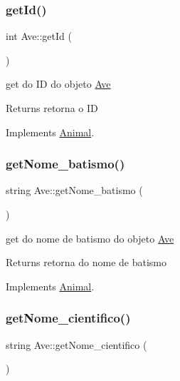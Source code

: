 \subsubsection{\texorpdfstring{getId()}{getId()}}
{\footnotesize\ttfamily int Ave\+::get\+Id (\begin{DoxyParamCaption}{ }\end{DoxyParamCaption})\hspace{0.3cm}{\ttfamily [virtual]}}



get do ID do objeto \mbox{\hyperlink{class_ave}{Ave}} 

\begin{DoxyReturn}{Returns}
retorna o ID 
\end{DoxyReturn}


Implements \mbox{\hyperlink{class_animal}{Animal}}.

\mbox{\label{class_ave_a12883f9a6f23577a64b39b26c9a8a88c}} 
\subsubsection{\texorpdfstring{getNome\_batismo()}{getNome\_batismo()}}
{\footnotesize\ttfamily string Ave\+::get\+Nome\+\_\+batismo (\begin{DoxyParamCaption}{ }\end{DoxyParamCaption})\hspace{0.3cm}{\ttfamily [virtual]}}



get do nome de batismo do objeto \mbox{\hyperlink{class_ave}{Ave}} 

\begin{DoxyReturn}{Returns}
retorna do nome de batismo 
\end{DoxyReturn}


Implements \mbox{\hyperlink{class_animal}{Animal}}.

\mbox{\label{class_ave_a6e40addf9eb4e33849279157285e774c}} 
\subsubsection{\texorpdfstring{getNome\_cientifico()}{getNome\_cientifico()}}
{\footnotesize\ttfamily string Ave\+::get\+Nome\+\_\+cientifico (\begin{DoxyParamCaption}{ }\end{DoxyParamCaption})\hspace{0.3cm}{\ttfamily [virtual]}}



